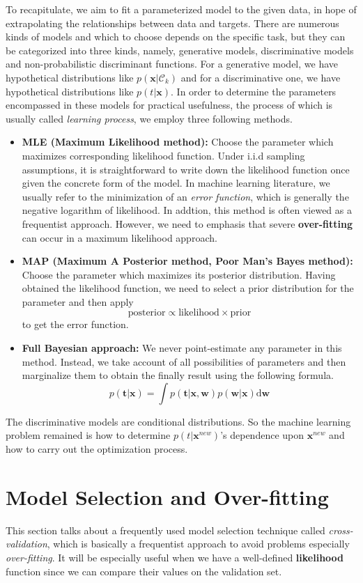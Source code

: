 \documentclass[a4paper]{report}
\newcommand{\ud}{\mathrm{d}}
\renewcommand{\bf}{\mathbf}
\renewcommand{\cal}{\mathcal}
\newcommand{\imp}[1]{{\color{blue}\textit{#1}}}
\begin{document}
To recapitulate, we aim to fit a parameterized model to the given data, in hope of extrapolating the relationships between data and targets. There are numerous kinds of models and which to choose depends on the specific task, but they can be categorized into three kinds, namely, generative models, discriminative models and non-probabilistic discriminant functions. For a generative model, we have hypothetical distributions like $p(\bf{x}|\cal{C}_k)$ and for a discriminative one, we have hypothetical distributions like $p(t|\bf{x})$. In order to determine the parameters encompassed in these models for practical usefulness, the process of which is usually called \imp{learning process}, we employ three following methods.
\begin{itemize}
\item \textbf{MLE (Maximum Likelihood method):} Choose the parameter which maximizes corresponding likelihood function. Under i.i.d sampling assumptions, it is straightforward to write down the likelihood function once given the concrete form of the model. In machine learning literature, we usually refer to the minimization of an \imp{error function}, which is generally the negative logarithm of likelihood. In addtion, this method is often viewed as a frequentist approach. However, we need to emphasis that severe \textbf{over-fitting} can occur in a maximum likelihood approach.\\
\item \textbf{MAP (Maximum A Posterior method, Poor Man's Bayes method):} Choose the parameter which maximizes its posterior distribution. Having obtained the likelihood function, we need to select a prior distribution for the parameter and then apply
\[
	\text{posterior} \propto \text{likelihood} \times \text{prior}
\]
to get the error function.\\
\item \textbf{Full Bayesian approach:} We never point-estimate any parameter in this method. Instead, we take account of all possibilities of parameters and then marginalize them to obtain the finally result using the following formula.
\[
	p(\bf{t}|\bf{x}) = \int p(\bf{t}|\bf{x},\bf{w}) p(\bf{w}|\bf{x}) \ud \bf{w}
\]
\end{itemize}
The discriminative models are conditional distributions. So the machine learning problem remained is how to determine $p(t|\bf{x}^{new})$'s dependence upon $\bf{x}^{new}$ and how to carry out the optimization process. 

\section{Model Selection and Over-fitting}
This section talks about a frequently used model selection technique called \imp{cross-validation}, which is basically a frequentist approach to avoid problems especially \textit{over-fitting}. It will be especially useful when we have a well-defined \textbf{likelihood} function since we can compare their values on the validation set.
\end{document}
